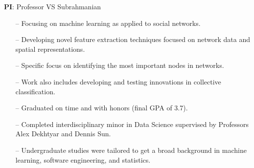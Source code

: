 
\textbf{PI}: Professor VS Subrahmanian 
\begin{itemize}
    \setlength{\itemindent}{0.5em}
    \item[--] Focusing on machine learning as applied to social networks.
    \item[--] Developing novel feature extraction techniques focused on network data and spatial representations.
        \item[--] Specific focus on identifying the most important nodes in  networks.
    \item[--] Work also includes developing and testing innovations in collective classification.
\end{itemize}
\smallskip


\begin{itemize}
    \setlength{\itemindent}{0.5em}
    \item[--] Graduated on time and with honors (final GPA of 3.7).
    \item[--] Completed interdisciplinary minor in Data Science supervised by Professors Alex Dekhtyar and Dennis Sun.
    \item[--] Undergraduate studies were tailored to get a broad background in machine learning, software engineering, and statistics.
\end{itemize}